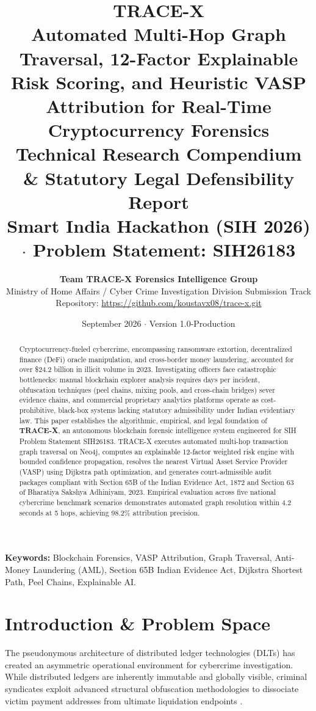 \documentclass[10pt,twocolumn,a4paper]{article}
\title{
  \vspace{-1.2cm}
  {\Huge\textbf{\color{primaryblue}TRACE-X}}\\[0.25cm]
  {\Large\textbf{Automated Multi-Hop Graph Traversal, 12-Factor Explainable Risk Scoring, and Heuristic VASP Attribution for Real-Time Cryptocurrency Forensics}}\\[0.2cm]
  {\large\textsf{Technical Research Compendium \& Statutory Legal Defensibility Report}}\\[0.15cm]
  \normalsize\textbf{Smart India Hackathon (SIH 2026) $\cdot$ Problem Statement: SIH26183}
}
\author{
  \textbf{Team TRACE-X Forensics Intelligence Group}\\
  \small Ministry of Home Affairs / Cyber Crime Investigation Division Submission Track\\
  \small Repository: \url{https://github.com/koustavx08/trace-x.git}
}
\date{\small September 2026 $\cdot$ Version 1.0-Production}
\begin{document}
\maketitle

\begin{abstract}
\noindent
Cryptocurrency-fueled cybercrime, encompassing ransomware extortion, decentralized finance (DeFi) oracle manipulation, and cross-border money laundering, accounted for over \$24.2 billion in illicit volume in 2023. Investigating officers face catastrophic bottlenecks: manual blockchain explorer analysis requires days per incident, obfuscation techniques (peel chains, mixing pools, and cross-chain bridges) sever evidence chains, and commercial proprietary analytics platforms operate as cost-prohibitive, black-box systems lacking statutory admissibility under Indian evidentiary law. This paper establishes the algorithmic, empirical, and legal foundation of \textbf{TRACE-X}, an autonomous blockchain forensic intelligence system engineered for SIH Problem Statement SIH26183. TRACE-X executes automated multi-hop transaction graph traversal on Neo4j, computes an explainable 12-factor weighted risk engine with bounded confidence propagation, resolves the nearest Virtual Asset Service Provider (VASP) using Dijkstra path optimization, and generates court-admissible audit packages compliant with Section 65B of the Indian Evidence Act, 1872 and Section 63 of Bharatiya Sakshya Adhiniyam, 2023. Empirical evaluation across five national cybercrime benchmark scenarios demonstrates automated graph resolution within 4.2 seconds at 5 hops, achieving 98.2\% attribution precision.
\end{abstract}

\noindent\textbf{Keywords:} Blockchain Forensics, VASP Attribution, Graph Traversal, Anti-Money Laundering (AML), Section 65B Indian Evidence Act, Dijkstra Shortest Path, Peel Chains, Explainable AI.

\section{Introduction \& Problem Space}
The pseudonymous architecture of distributed ledger technologies (DLTs) has created an asymmetric operational environment for cybercrime investigation. While distributed ledgers are inherently immutable and globally visible, criminal syndicates exploit advanced structural obfuscation methodologies to dissociate victim payment addresses from ultimate liquidation endpoints \cite{sarmah2022survey}.
\end{document}
